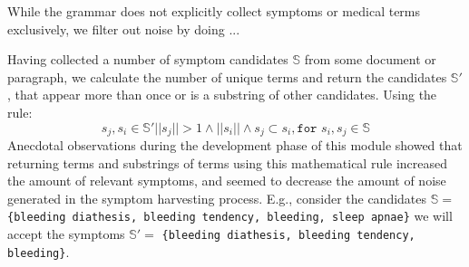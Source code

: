 \documentclass[10pt,letterpaper,final]{article}
\begin{document}
While the grammar does not explicitly collect symptoms or medical terms
exclusively, we filter out noise by doing ...


Having collected a number of symptom candidates $\mathbb{S}$ from some
document or paragraph, we calculate the number of unique terms and return
the candidates $\mathbb{S'}$, that appear more than once or is a
substring of other candidates.  Using the rule:
\begin{equation}
 s_{j}, s_{i} \in \mathbb{S'} ||s_{j}|| > 1 \wedge||s_{i}|| \wedge s_{j} \subset s_{i}, \texttt{for } s_{i}, s_{j} \in \mathbb{S}
\end{equation}
Anecdotal observations during the development phase of this module
showed that returning terms and substrings of terms using this
mathematical rule increased the amount of relevant symptoms, and seemed
to decrease the amount of noise generated in the symptom harvesting
process. E.g., consider the candidates $\mathbb{S} = $
\texttt{\{bleeding diathesis, bleeding tendency, bleeding, sleep
apnae\}} we will accept the symptoms $\mathbb{S'} = $ \texttt{\{bleeding
diathesis, bleeding tendency, bleeding\}}.





\end{document}
